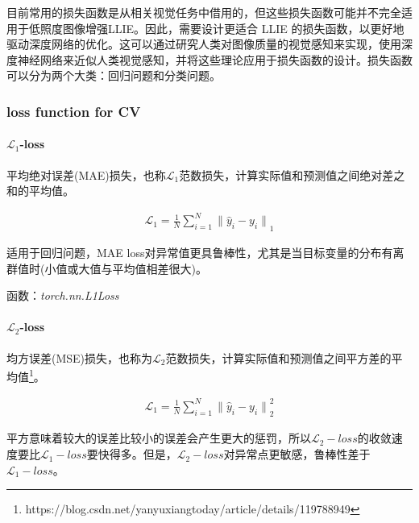 \documentclass[letterpaper,12pt]{article}
\begin{document}
	目前常用的损失函数是从相关视觉任务中借用的，但这些损失函数可能并不完全适用于低照度图像增强LLIE。因此，需要设计更适合 LLIE 的损失函数，以更好地驱动深度网络的优化。这可以通过研究人类对图像质量的视觉感知来实现，使用深度神经网络来近似人类视觉感知，并将这些理论应用于损失函数的设计。损失函数可以分为两个大类：回归问题和分类问题。
	
	
	
		\subsubsection{loss function for CV}
		
			\paragraph{$\mathcal{L}_1$-loss}
		
			平均绝对误差(MAE)损失，也称$\mathcal{L}_1$范数损失，计算实际值和预测值之间绝对差之和的平均值。
			
			\begin{equation}
				\begin{aligned}
					\mathcal{L}_1 = \frac{1}{N} \sum_{i=1}^{N} {\| \hat{y}_i - y_i \|}_{1}
				\end{aligned}
			\end{equation}
		
			适用于回归问题，MAE loss对异常值更具鲁棒性，尤其是当目标变量的分布有离群值时(小值或大值与平均值相差很大)。
			
			函数：\textit{torch.nn.L1Loss}
			
			\paragraph{$\mathcal{L}_2$-loss}
			
			均方误差(MSE)损失，也称为$\mathcal{L}_2$范数损失，计算实际值和预测值之间平方差的平均值\footnote{https://blog.csdn.net/yanyuxiangtoday/article/details/119788949}。
			
			\begin{equation}
			\begin{aligned}
				\mathcal{L}_1 = \frac{1}{N} \sum_{i=1}^{N} {\| \hat{y}_i - y_i \|}_{2}^2
			\end{aligned}
			\end{equation}
			
			
			平方意味着较大的误差比较小的误差会产生更大的惩罚，所以$\mathcal{L}_2-loss$的收敛速度要比$\mathcal{L}_1-loss$要快得多。但是，$\mathcal{L}_2-loss$对异常点更敏感，鲁棒性差于$\mathcal{L}_1-loss$。
			
\end{document}
